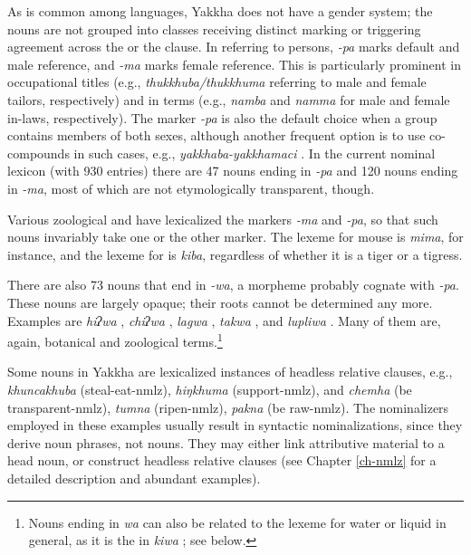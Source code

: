 As is common among  languages, Yakkha does not have a gender system; the nouns are not grouped into classes receiving distinct marking or triggering agreement across the  or the clause. In  referring to persons, \emph{-pa} marks default and male reference, and \emph{-ma} marks female reference. This is particularly prominent in occupational titles (e.g., \emph{thukkhuba/thukkhuma} referring to male and female tailors, respectively) and in  terms (e.g., \emph{namba} and \emph{namma} for male and female in-laws, respectively). The marker \emph{-pa} is also the default choice when a group contains members of both sexes, although another frequent option is to use co-compounds in such cases, e.g., \emph{yakkhaba-yakkhamaci} . In the current nominal lexicon (with 930 entries)  there are 47 nouns ending in \emph{-pa} and 120 nouns ending in \emph{-ma},  most of which are not etymologically transparent, though.

Various zoological and  have lexicalized the markers \emph{-ma} and \emph{-pa}, so that such nouns invariably take one or the other marker. The lexeme  for mouse is \emph{mima},  for instance,  and the lexeme for  is  \emph{kiba}, regardless of whether it is a  tiger or a tigress.

There are also 73 nouns that end in \emph{-wa}, a morpheme probably cognate with \emph{-pa}. These nouns are largely opaque; their roots cannot be determined any more. Examples are \emph{hiʔwa} , \emph{chiʔwa} , \emph{lagwa} , \emph{takwa} , and \emph{lupliwa} . Many of them are, again,  botanical and zoological terms.\footnote{Nouns ending in \emph{wa} can also be related to the lexeme for water or liquid in general, as it is the  in \emph{kiwa} ; see below.}

Some nouns in Yakkha are lexicalized instances of headless relative clauses, e.g.,  \emph{khuncakhuba}  (steal-eat-{\sc nmlz}), \emph{hiŋkhuma}  (support-{\sc nmlz}), and \emph{chemha}  (be transparent-{\sc nmlz}),  \emph{tumna}  (ripen-{\sc nmlz}), \emph{pakna}  (be raw-{\sc nmlz}). The nominalizers employed in these examples usually result in syntactic nominalizations, since they derive noun phrases, not nouns. They may either link attributive material to a head noun, or  construct headless relative clauses  (see  Chapter \ref{ch-nmlz} for a detailed description and abundant examples). 


